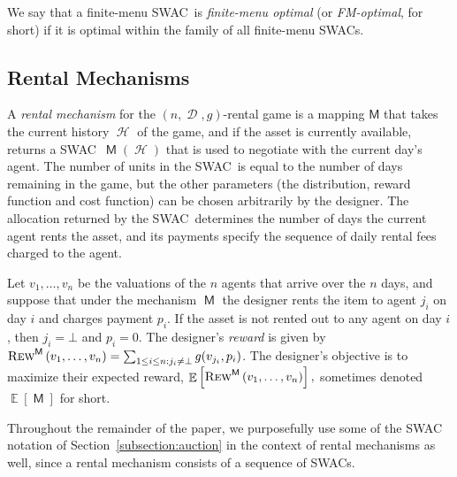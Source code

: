 \documentclass[11pt,letterpaper]{article}
\newcommand{\sqbr}[1]{\left[ #1 \right]}
\newcommand{\swac}{SWAC\xspace}
\newcommand{\swacs}{SWACs\xspace}
\newcommand{\finauc}{finite-menu \swac}
\newcommand{\finaucs}{finite-menu \swacs}
\DeclareMathOperator*{\E}{\bb{E}}
\DeclareMathOperator{\history}{\mathcal{H}}
\newcommand{\bb}[1]{\mathbb{#1}}
\DeclareMathOperator{\A}{\auc{A}}
\DeclareMathOperator{\D}{\mathcal{D}}
\DeclareMathOperator{\M}{\mech{M}}
\newcommand{\g}{g}
\theoremstyle{plain}
\newtheorem{observation}{Observation}
\newcommand{\auc}[1]{\mathsf{#1}}
\newcommand{\mech}[1]{\mathsf{#1}}
\begin{document}
We say that a \finauc\ is \emph{finite-menu optimal} (or \emph{FM-optimal}, for short)
if it is optimal within the family of all \finaucs.


\subsection{Rental Mechanisms}\label{sec:rental_mech_definitions}
 A \emph{rental mechanism} for the $(n, \boldsymbol{\D},\g)$-rental game is 
 a mapping $\mech{M}$ that
 takes the current history $\history$ of the game,
 and if the asset is currently available,
 returns a \swac\ $\M(\history)$
 that is used to negotiate with the current day's agent.
 The number of units in the \swac\ is equal to the
 number of days remaining in the game,
 but the other parameters (the distribution, reward function and cost function) can be chosen arbitrarily by the designer.
   The allocation returned by the \swac\ determines the number of days the current agent rents the asset, and its payments specify the sequence of daily rental fees charged to the agent.
  

Let $v_1,\ldots,v_n$ be the valuations of the $n$ agents that arrive over the $n$ days,
and suppose that under the mechanism $\M$
the designer rents the item to agent $j_i$ on day $i$ and charges payment $p_i$.
If the asset is not rented out to any agent on day $i$, then $j_i = \bot$ and $p_i = 0$.
The designer's \emph{reward}
is given by 
$\trew[\mech{M}]{v_1,\dots,v_n} = \sum_{1 \leq i \leq n : j_i \neq \bot} g( v_{j_i}, p_i)$.
The designer’s objective is to maximize their expected reward,
$
\E\sqbr{\trew[\mech{M}]{v_1,\dots,v_n}},
$ 
sometimes denoted $\E[\M]$ for short.

Throughout the remainder of the paper, we purposefully use some of the \swac notation of Section~\ref{subsection:auction} in the context of rental mechanisms as well, since a rental mechanism consists of a sequence of \swacs.



\end{document}

